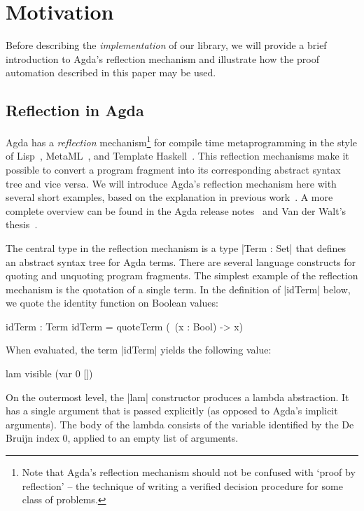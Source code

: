 \documentclass[preprint]{sigplanconf}
\begin{document}
\section{Motivation}
\label{sec:motivation}

Before describing the \emph{implementation} of our library, we will
provide a brief introduction to Agda's reflection mechanism and
illustrate how the proof automation described in this paper may be
used.

\subsection*{Reflection in Agda}

Agda has a \emph{reflection} mechanism\footnote{Note that Agda's
  reflection mechanism should not be confused with `proof by
  reflection' -- the technique of writing a verified decision
  procedure for some class of problems.} for compile time
metaprogramming in the style of Lisp~\cite{lisp-macros},
MetaML~\cite{metaml}, and Template
Haskell~\cite{template-haskell}. This reflection mechanisms make it
possible to convert a program fragment into its corresponding abstract
syntax tree and vice versa. We will introduce Agda's reflection
mechanism here with several short examples, based on the explanation
in previous work~\cite{van-der-walt}. A more complete overview can be
found in the Agda release notes~\cite{agda-relnotes-228} and Van der
Walt's thesis~\cite{vdWalt:Thesis:2012}.

The central type in the reflection mechanism is a type |Term : Set|
that defines an abstract syntax tree for Agda terms. There are several
language constructs for quoting and unquoting program fragments. The simplest
example of the reflection mechanism is the quotation of a single
term. In the definition of |idTerm| below, we quote the identity
function on Boolean values:
\begin{code}
  idTerm : Term
  idTerm = quoteTerm (\ (x : Bool) -> x)
\end{code}
When evaluated, the term |idTerm| yields the following value:
\begin{code}
  lam visible (var 0 []) 
\end{code}
On the outermost level, the |lam| constructor produces a lambda
abstraction. It has a single argument that is passed explicitly (as
opposed to Agda's implicit arguments). The body of the lambda consists
of the variable identified by the De Bruijn index 0, applied to an
empty list of arguments.
\end{document}
